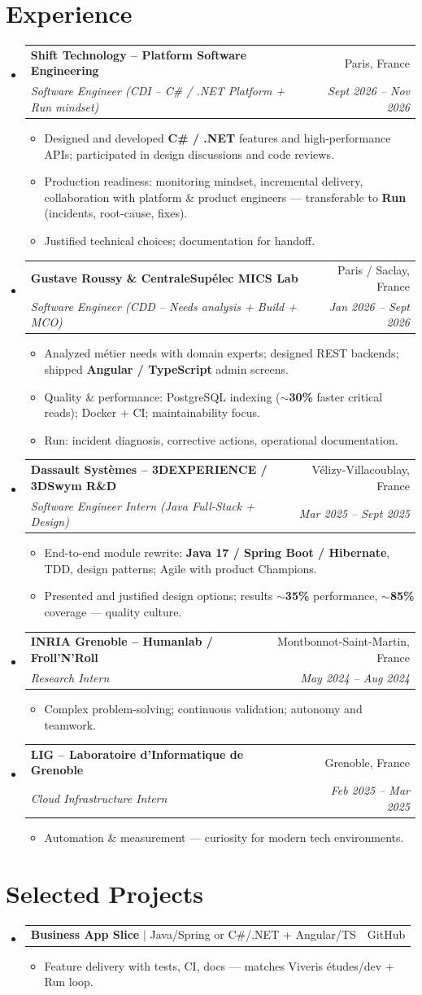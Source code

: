 \documentclass[letterpaper,10.5pt]{article}
\makeatletter
\newcommand{\resumeItem}[1]{\item\small{#1 \vspace{-1.5pt}}}
\newcommand{\resumeSubheading}[4]{\vspace{-1pt}\item\begin{tabular*}{0.97\textwidth}[t]{l@{\extracolsep{\fill}}r}\textbf{#1} & #2 \\\textit{\small#3} & \textit{\small #4} \\\end{tabular*}\vspace{-5pt}}
\newcommand{\resumeProjectHeading}[2]{\item\begin{tabular*}{0.97\textwidth}{l@{\extracolsep{\fill}}r}\small#1 & #2 \\\end{tabular*}\vspace{-5pt}}
\newcommand{\resumeSubHeadingListStart}{\begin{itemize}[leftmargin=0.15in, label={}]}
\newcommand{\resumeSubHeadingListEnd}{\end{itemize}}
\newcommand{\resumeItemListStart}{\begin{itemize}[leftmargin=0.18in]}
\newcommand{\resumeItemListEnd}{\end{itemize}\vspace{-3pt}}
\makeatother
\begin{document}
\section{Experience}
\resumeSubHeadingListStart
  \resumeSubheading
    {Shift Technology -- Platform Software Engineering}{Paris, France}
    {Software Engineer (CDI -- C\# / .NET Platform + Run mindset)}{Sept 2026 -- Nov 2026}
    \resumeItemListStart
      \resumeItem{Designed and developed \textbf{C\# / .NET} features and high-performance APIs; participated in design discussions and code reviews.}
      \resumeItem{Production readiness: monitoring mindset, incremental delivery, collaboration with platform \& product engineers --- transferable to \textbf{Run} (incidents, root-cause, fixes).}
      \resumeItem{Justified technical choices; documentation for handoff.}
    \resumeItemListEnd
  \resumeSubheading
    {Gustave Roussy \& CentraleSup\'elec MICS Lab}{Paris / Saclay, France}
    {Software Engineer (CDD -- Needs analysis + Build + MCO)}{Jan 2026 -- Sept 2026}
    \resumeItemListStart
      \resumeItem{Analyzed m\'etier needs with domain experts; designed REST backends; shipped \textbf{Angular / TypeScript} admin screens.}
      \resumeItem{Quality \& performance: PostgreSQL indexing (\textbf{$\sim$30\%} faster critical reads); Docker + CI; maintainability focus.}
      \resumeItem{Run: incident diagnosis, corrective actions, operational documentation.}
    \resumeItemListEnd
  \resumeSubheading
    {Dassault Syst\`emes -- 3DEXPERIENCE / 3DSwym R\&D}{V\'elizy-Villacoublay, France}
    {Software Engineer Intern (Java Full-Stack + Design)}{Mar 2025 -- Sept 2025}
    \resumeItemListStart
      \resumeItem{End-to-end module rewrite: \textbf{Java 17 / Spring Boot / Hibernate}, TDD, design patterns; Agile with product Champions.}
      \resumeItem{Presented and justified design options; results \textbf{$\sim$35\%} performance, \textbf{$\sim$85\%} coverage --- quality culture.}
    \resumeItemListEnd
  \resumeSubheading
    {INRIA Grenoble -- Humanlab / Froll'N'Roll}{Montbonnot-Saint-Martin, France}
    {Research Intern}{May 2024 -- Aug 2024}
    \resumeItemListStart
      \resumeItem{Complex problem-solving; continuous validation; autonomy and teamwork.}
    \resumeItemListEnd
  \resumeSubheading
    {LIG -- Laboratoire d'Informatique de Grenoble}{Grenoble, France}
    {Cloud Infrastructure Intern}{Feb 2025 -- Mar 2025}
    \resumeItemListStart
      \resumeItem{Automation \& measurement --- curiosity for modern tech environments.}
    \resumeItemListEnd
\resumeSubHeadingListEnd
\section{Selected Projects}
\resumeSubHeadingListStart
  \resumeProjectHeading{\textbf{Business App Slice} $|$ Java/Spring or C\#/.NET + Angular/TS}{GitHub}
    \resumeItemListStart
      \resumeItem{Feature delivery with tests, CI, docs --- matches Viveris \'etudes/dev + Run loop.}
    \resumeItemListEnd
\resumeSubHeadingListEnd
\end{document}
